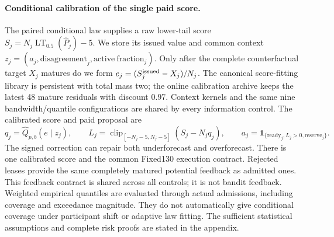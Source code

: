 \paragraph{Conditional calibration of the single paid score.}
The paired conditional law supplies a raw lower-tail score
$S_j=N_j\operatorname{LT}_{0.5}(\widehat P_j)-5$.
We store its issued value and common context
$z_j=(a_j,\mathrm{disagreement}_j,\mathrm{active\ fraction}_j)$.
Only after the complete counterfactual target $X_j$ matures do we form
$e_j=(S_j^{\rm issued}-X_j)/N_j$. The canonical score-fitting library
is persistent with total mass two; the online calibration archive keeps
the latest 48 mature residuals with discount 0.97. Context kernels and
the same nine bandwidth/quantile configurations are shared by every
information control. The calibrated score and paid proposal are
\begin{equation}
 q_j=\widehat Q_{p,b}(e\mid z_j),\qquad
 L_j=\operatorname{clip}_{[-N_j-5,N_j-5]}(S_j-N_jq_j),\qquad
 a_j=\mathbf1_{\{\mathrm{ready}_j,L_j>0,\mathrm{reserve}_j\}}.
 \label{eq:conditional-immutable-score}
\end{equation}
The signed correction can repair both underforecast and overforecast.
There is one calibrated score and the common Fixed130 execution contract.
Rejected leases provide the same completely matured potential feedback
as admitted ones. This feedback contract is shared across all controls;
it is not bandit feedback. Weighted empirical quantiles are evaluated
through actual admissions, including coverage and exceedance magnitude.
They do not automatically give conditional coverage under participant
shift or adaptive law fitting. The sufficient statistical assumptions
and complete risk proofs are stated in the appendix.
